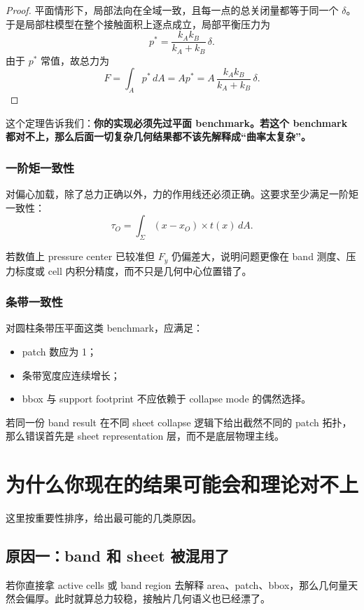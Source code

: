 \documentclass[12pt,a4paper]{ctexart}
\begin{document}
\begin{proof}
平面情形下，局部法向在全域一致，且每一点的总关闭量都等于同一个 $\delta$。于是局部柱模型在整个接触面积上逐点成立，局部平衡压力为
\begin{equation}
    p^*=\frac{k_Ak_B}{k_A+k_B}\,\delta.
\end{equation}
由于 $p^*$ 常值，故总力为
\begin{equation}
    F=\int_A p^*\,dA = A p^* = A\,\frac{k_Ak_B}{k_A+k_B}\,\delta.
\end{equation}
\end{proof}

这个定理告诉我们：\textbf{你的实现必须先过平面 benchmark。若这个 benchmark 都对不上，那么后面一切复杂几何结果都不该先解释成“曲率太复杂”。}

\subsubsection{一阶矩一致性}
对偏心加载，除了总力正确以外，力的作用线还必须正确。这要求至少满足一阶矩一致性：
\begin{equation}
    \tau_O = \int_{\Sigma}(x-x_O)\times t(x)\,dA.
\end{equation}

若数值上 pressure center 已较准但 $F_y$ 仍偏差大，说明问题更像在 band 测度、压力标度或 cell 内积分精度，而不只是几何中心位置错了。

\subsubsection{条带一致性}
对圆柱条带压平面这类 benchmark，应满足：
\begin{itemize}
    \item patch 数应为 1；
    \item 条带宽度应连续增长；
    \item bbox 与 support footprint 不应依赖于 collapse mode 的偶然选择。
\end{itemize}

若同一份 band result 在不同 sheet collapse 逻辑下给出截然不同的 patch 拓扑，那么错误首先是 sheet representation 层，而不是底层物理主线。

\section{为什么你现在的结果可能会和理论对不上}

这里按重要性排序，给出最可能的几类原因。

\subsection{原因一：band 和 sheet 被混用了}
若你直接拿 active cells 或 band region 去解释 area、patch、bbox，那么几何量天然会偏厚。此时就算总力较稳，接触片几何语义也已经漂了。
\end{document}
